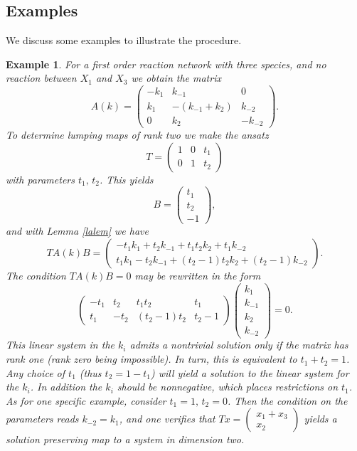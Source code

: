 \documentclass{article}
\newtheorem{example}{Example}
\begin{document}
\subsection{Examples}
    We discuss some examples to illustrate the procedure.
\begin{example}{\em 
For a first order reaction network with three species, and no reaction between $X_1$ and $X_3$ we obtain the matrix
\[
A(k)=\begin{pmatrix}-k_1&k_{-1}&0\\ k_1&-(k_{-1}+k_2)& k_{-2}\\ 0 & k_2 & -k_{-2}\end{pmatrix}.
\]
To determine lumping maps of rank two we make the ansatz
\[
T=\begin{pmatrix} 1 & 0 & t_1\\ 0&1&t_2\end{pmatrix}
\]
with parameters $t_1,\,t_2$. This yields
\[
B=\begin{pmatrix} t_1\\ t_2\\ -1\end{pmatrix},
\]
and with Lemma \ref{lalem} we have
\[
TA(k)B=\begin{pmatrix} -t_1k_1+t_2k_{-1}+t_1t_2k_2+t_1k_{-2}\\ t_1k_1-t_2k_{-1}+(t_2-1)t_2k_2+(t_2-1)k_{-2}  \end{pmatrix}.
\]
The condition $TA(k)B=0$ may be rewritten in the form
\[
\begin{pmatrix} -t_1&t_2&t_1t_2&t_1\\ t_1&-t_2&(t_2-1)t_2&t_2-1  \end{pmatrix}\begin{pmatrix}
    k_1\\ k_{-1}\\ k_2\\ k_{-2}
\end{pmatrix}=0.
\]
This linear system in the $k_i$ admits a nontrivial solution only if the matrix has rank one (rank zero being impossible). In turn, this is equivalent to $t_1+t_2=1$.
Any choice of $t_1$ (thus $t_2=1-t_1$) will yield a solution to the linear system for the $k_i$. In addition the $k_i$ should be nonnegative, which places restrictions on $t_1$.\\
As for one specific example, consider $t_1=1,\,t_2=0$. Then the condition on the parameters reads $k_{-2}=k_1$, and one verifies that $Tx=\begin{pmatrix}
    x_1+x_3\\ x_2
\end{pmatrix}$ yields a solution preserving map to a system in dimension two.
}
\end{example}
\end{document}

